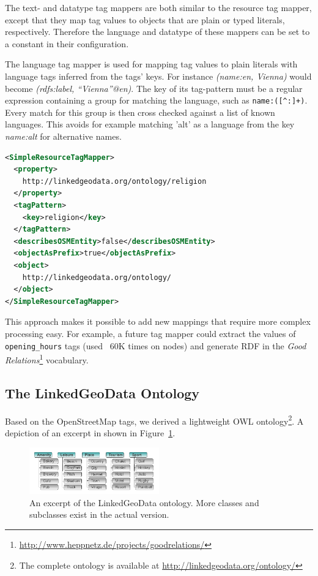 The text- and datatype tag mappers are both similar to the resource tag
mapper, except that they map tag values to objects that are plain or typed
literals, respectively. Therefore the language and datatype of these mappers can
be set to a constant in their configuration.


The language tag mapper is used for mapping tag values to plain
literals with language tags inferred from the tags' keys. For instance
\emph{(name:en, Vienna)} would become \emph{(rdfs:label, ``Vienna''@en)}.
The key of its tag-pattern must be a regular expression containing a group for
matching the language, such as \verb=name:([^:]+)=. Every match for this
group is then cross checked against a list of known languages. This avoids for
example matching 'alt' as a language from the key
\emph{name:alt} for alternative names.

\begin{scriptsize}
\begin{lstlisting}[label=lst:tag-mapping, language=XML, caption=Example of a mapping declaration.]
<SimpleResourceTagMapper>
  <property>
    http://linkedgeodata.org/ontology/religion
  </property>
  <tagPattern>
    <key>religion</key>
  </tagPattern>
  <describesOSMEntity>false</describesOSMEntity>
  <objectAsPrefix>true</objectAsPrefix>
  <object>
    http://linkedgeodata.org/ontology/
  </object>
</SimpleResourceTagMapper>
\end{lstlisting}
\end{scriptsize}

This approach makes it possible to add new mappings that require more complex
processing easy. For example, a future tag mapper could extract the values of
\texttt{opening\_hours} tags (used ~60K times on nodes) and generate RDF in the
\textit{Good Relations}\footnote{\url{http://www.heppnetz.de/projects/goodrelations/}} vocabulary.

\subsection{The LinkedGeoData Ontology}
Based on the OpenStreetMap tags, we derived a lightweight OWL
ontology\footnote{The complete ontology is available at \url{http://linkedgeodata.org/ontology/}}.
A depiction of an excerpt in shown
in Figure~\ref{fig:ontology-excerpt}.
\begin{figure}[htbp]
	\centering
		\includegraphics[width=0.5\textwidth]{images/OntologyExcerpt.pdf}
	\caption{An excerpt of the LinkedGeoData ontology.
	More classes and subclasses exist in the actual version.}
	\label{fig:ontology-excerpt}
\end{figure}


